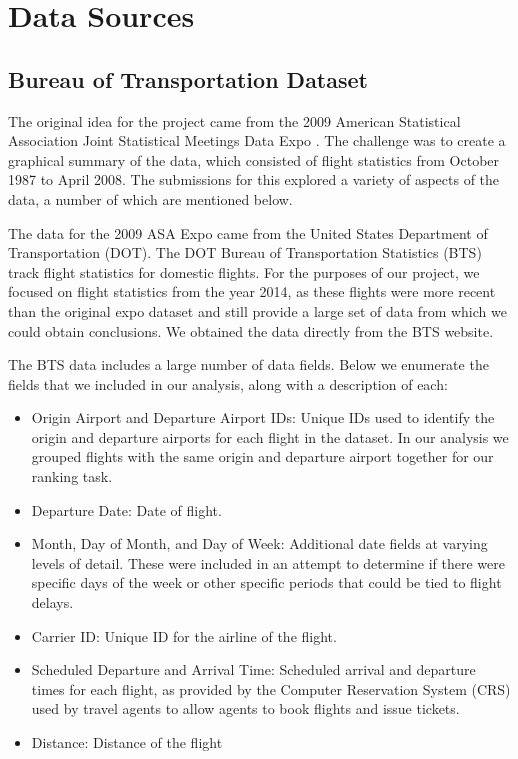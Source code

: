 \documentclass{article}
\begin{document}
\section{Data Sources}

\label{sec:data-sources}
\subsection{Bureau of Transportation Dataset}

The original idea for the project came from the 2009 American Statistical Association Joint Statistical Meetings Data Expo \cite{wickham2011asa}.
The challenge was to create a graphical summary of the data, which consisted of flight statistics from October 1987 to April 2008.
The submissions for this explored a variety of aspects of the data, a number of which are mentioned below.

The data for the 2009 ASA Expo came from the United States Department of Transportation (DOT).
The DOT Bureau of Transportation Statistics (BTS) track flight statistics for domestic flights. For the purposes of our project, we focused on flight statistics from the year 2014, as these flights were more recent than the original expo dataset and still provide a large set of data from which we could obtain conclusions. We obtained the data directly from the BTS website.

The BTS data includes a large number of data fields. Below we enumerate the fields that we included in our analysis, along with a description of each:

\begin{itemize}
\item Origin Airport and Departure Airport IDs: Unique IDs used to identify the origin and departure airports for each flight in the dataset. In our analysis we grouped flights with the same origin and departure airport together for our ranking task.
\item Departure Date: Date of flight. 
\item Month, Day of Month, and Day of Week: Additional date fields at varying levels of detail. These were included in an attempt to determine if there were specific days of the week or other specific periods that could be tied to flight delays. 
\item Carrier ID: Unique ID for the airline of the flight.
\item Scheduled Departure and Arrival Time: Scheduled arrival and departure times for each flight, as provided by the Computer Reservation System (CRS) used by travel agents to allow agents to book flights and issue tickets.
\item Distance: Distance of the flight
\end{itemize}
\end{document}
